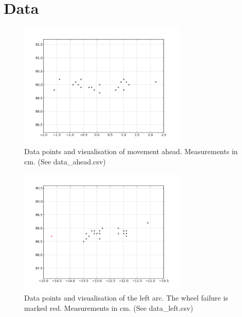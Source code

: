 \documentclass{scrartcl}
\begin{document}
\section{Data}

 \begin{figure}[h]
\centering
\begin{minipage}{.5\textwidth}
  \centering
\end{minipage}%
\begin{minipage}{.5\textwidth}
  \centering
   \includegraphics[width= 8cm]{img/data_ahead.png}  
\end{minipage}
\caption{Data points and visualisation of movement ahead. Measurements in cm. (See data\_ahead.csv)}
\label{fig:data_ahead}
\end{figure}

\begin{figure}[h]
\centering
\begin{minipage}{.5\textwidth}
  \centering
\end{minipage}%
\begin{minipage}{.5\textwidth}
  \centering
   \includegraphics[width= 8cm]{img/data_left.png}  
\end{minipage}
\caption{Data points and visualisation of the left arc. The wheel failure is marked red. Measurements in cm.  (See data\_left.csv)}
\label{fig:data_left}
\end{figure}
\end{document}
